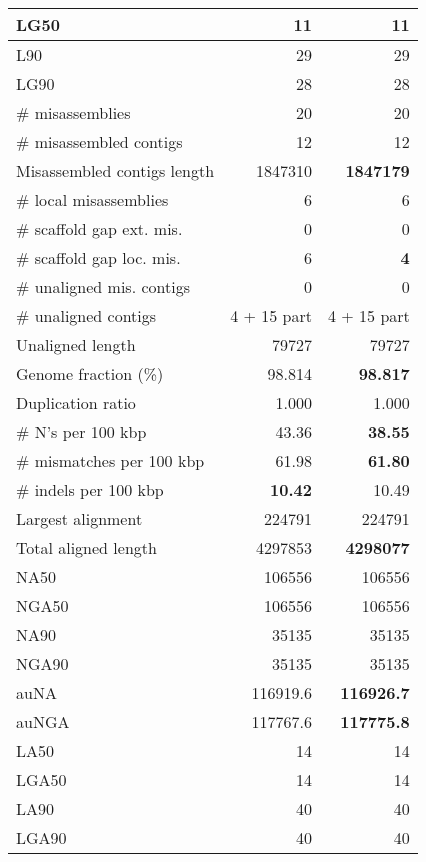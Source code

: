 \documentclass[12pt,a4paper]{article}
\begin{document}
\begin{table}[ht]
\begin{center}
\begin{tabular}{|l*{2}{|r}|}
LG50 & 11 & 11 \\ \hline
L90 & 29 & 29 \\ \hline
LG90 & 28 & 28 \\ \hline
\# misassemblies & 20 & 20 \\ \hline
\# misassembled contigs & 12 & 12 \\ \hline
Misassembled contigs length & 1847310 & {\bf 1847179} \\ \hline
\# local misassemblies & 6 & 6 \\ \hline
\# scaffold gap ext. mis. & 0 & 0 \\ \hline
\# scaffold gap loc. mis. & 6 & {\bf 4} \\ \hline
\# unaligned mis. contigs & 0 & 0 \\ \hline
\# unaligned contigs & 4 + 15 part & 4 + 15 part \\ \hline
Unaligned length & 79727 & 79727 \\ \hline
Genome fraction (\%) & 98.814 & {\bf 98.817} \\ \hline
Duplication ratio & 1.000 & 1.000 \\ \hline
\# N's per 100 kbp & 43.36 & {\bf 38.55} \\ \hline
\# mismatches per 100 kbp & 61.98 & {\bf 61.80} \\ \hline
\# indels per 100 kbp & {\bf 10.42} & 10.49 \\ \hline
Largest alignment & 224791 & 224791 \\ \hline
Total aligned length & 4297853 & {\bf 4298077} \\ \hline
NA50 & 106556 & 106556 \\ \hline
NGA50 & 106556 & 106556 \\ \hline
NA90 & 35135 & 35135 \\ \hline
NGA90 & 35135 & 35135 \\ \hline
auNA & 116919.6 & {\bf 116926.7} \\ \hline
auNGA & 117767.6 & {\bf 117775.8} \\ \hline
LA50 & 14 & 14 \\ \hline
LGA50 & 14 & 14 \\ \hline
LA90 & 40 & 40 \\ \hline
LGA90 & 40 & 40 \\ \hline
\end{tabular}
\end{center}
\end{table}
\end{document}

